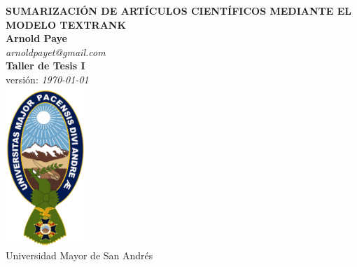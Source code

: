 \begin{titlepage}
	\begin{center}
		{\huge\bfseries SUMARIZACI\'ON DE  ART\'ICULOS CIENT\'IFICOS
		MEDIANTE EL MODELO TEXTRANK} \\
		\vspace{1.5cm}
		{\Large\bfseries Arnold Paye} \\ [5pt]
		\emph {arnoldpayet@gmail.com} \\[5pt]
		{\small\bfseries Taller de Tesis I} \\
		{\tiny versi\'on: \emph \today\ } \\
		\vspace{1.5cm}
		\includegraphics[width=3cm,height=6cm]{recursos/img/logo_umsa} \\
		{Universidad Mayor de San Andr\'es} 
	\end{center}
\end{titlepage}
